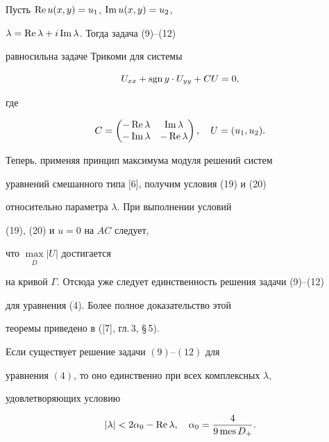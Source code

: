\begin{pf}


Пусть $\operatorname{Re} u(x,y)=u_1$, $\operatorname{Im} u(x,y)=u_2$,


$\lambda =\operatorname{Re}\lambda +i \operatorname{Im} \lambda$. Тогда задача (9)--(12)


равносильна задаче Трикоми для системы


$$


U_{xx}+\sgn y\cdot U_{yy}+CU=0,


$$


где


$$


C=\begin{pmatrix}


-\re \lambda & \im \lambda\\


- \im \lambda & - \re \lambda


\end{pmatrix},\quad U=(u_1,u_2).


$$





Теперь, применяя принцип максимума модуля решений систем


уравнений смешанного типа [6], получим условия (19) и (20)


относительно параметра $\lambda$. При выполнении условий


(19), (20) и $u=0$ на $AC$ следует,


что $\max\limits_{\overline D}|U|$ достигается


на кривой $\Gamma$. Отсюда уже следует единственность решения задачи (9)--(12)


для уравнения (4). Более полное доказательство этой


теоремы приведено в ([7], гл.\,3, \S\,5).


\end{pf}





\begin{thm}


Если существует решение задачи $(9)$--$(12)$ для


уравнения $(4)$, то оно единственно при всех комплексных $\lambda$,


удовлетворяющих условию 


\begin{equation}


|\lambda |<2\alpha_0-\re \lambda ,\quad \alpha_0=\frac {4}{9\mes D_+} .


\end{equation}


\end{thm}





